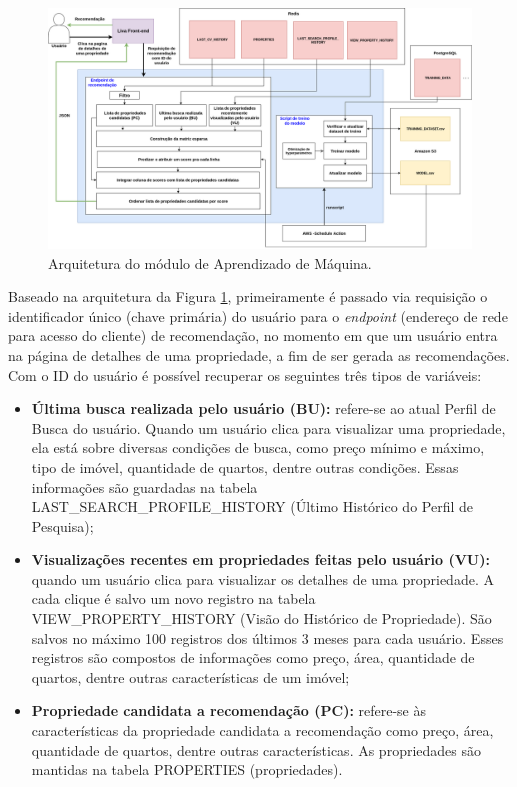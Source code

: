 \begin{figure}
    \centering
    \includegraphics[scale=0.4]{figuras/proposta/sr_nivel3.png}
    \caption[Arquitetura do módulo de Aprendizado de Máquina]{Arquitetura do módulo de Aprendizado de Máquina.}
    \label{fig:sr_nivel3}
\end{figure}

Baseado na arquitetura da Figura \ref{fig:sr_nivel3}, primeiramente é passado via requisição o identificador único (chave primária) do usuário para o \textit{endpoint} (endereço de rede para acesso do cliente) de recomendação, no momento em que um usuário entra na página de detalhes de uma propriedade, a fim de ser gerada as recomendações. Com o ID do usuário é possível recuperar os seguintes três tipos de variáveis:

\begin{itemize}
    \item \textbf{Última busca realizada pelo usuário (BU):} refere-se ao atual Perfil de Busca do usuário. Quando um usuário clica para visualizar uma propriedade, ela está sobre diversas condições de busca, como preço mínimo e máximo, tipo de imóvel, quantidade de quartos, dentre outras condições. Essas informações são guardadas na tabela LAST\_SEARCH\_PROFILE\_HISTORY (Último Histórico do Perfil de Pesquisa);

    \item \textbf{Visualizações recentes em propriedades feitas pelo usuário (VU):} quando um usuário clica para visualizar os detalhes de uma propriedade. A cada clique é salvo um novo registro na tabela VIEW\_PROPERTY\_HISTORY (Visão do Histórico de Propriedade). São salvos no máximo 100 registros dos últimos 3 meses para cada usuário. Esses registros são compostos de informações como preço, área, quantidade de quartos, dentre outras características de um imóvel;

    \item \textbf{Propriedade candidata a recomendação (PC):} refere-se às características da propriedade candidata a recomendação como preço, área, quantidade de quartos, dentre outras características. As propriedades são mantidas na tabela PROPERTIES (propriedades).
\end{itemize}

